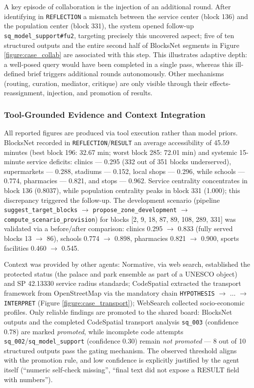 A key episode of collaboration is the injection of an additional round.
After identifying in \texttt{REFLECTION} a mismatch between the service center (block 136) and the population center (block 331), the system opened follow-up \texttt{sq\_model\_support\#fu2}, targeting precisely this uncovered aspect; five of ten structured outputs and the entire second half of BlocksNet segments in Figure \ref{figure:case_collab} are associated with this step.
This illustrates adaptive depth: a well-posed query would have been completed in a single pass, whereas this ill-defined brief triggers additional rounds autonomously.
Other mechanisms (routing, curation, mediator, critique) are only visible through their effects-reassignment, injection, and promotion of results.

\subsubsection{Tool-Grounded Evidence and Context Integration}

All reported figures are produced via tool execution rather than model priors.
BlocksNet recorded in \texttt{REFLECTION}/\texttt{RESULT} an average accessibility of 45.59 minutes (best block 196: 32.67 min; worst block 285: 72.01 min) and systemic 15-minute service deficits: clinics --- 0.295 (332 out of 351 blocks underserved), supermarkets --- 0.288, stadiums --- 0.152, local shops --- 0.296, while schools --- 0.774, pharmacies --- 0.821, and stops --- 0.962.
Service centrality concentrates in block 136 (0.8037), while population centrality peaks in block 331 (1.000); this discrepancy triggered the follow-up.
The development scenario (pipeline \texttt{suggest\_target\_blocks} $\rightarrow$ \texttt{propose\_zone\_development} $\rightarrow$ \texttt{compute\_scenario\_provision}) for blocks [2, 9, 18, 87, 89, 108, 289, 331] was validated via a before/after comparison: clinics 0.295 $\rightarrow$ 0.833 (fully served blocks 13 $\rightarrow$ 86), schools 0.774 $\rightarrow$ 0.898, pharmacies 0.821 $\rightarrow$ 0.900, sports facilities 0.460 $\rightarrow$ 0.545.

Context was provided by other agents: Normative, via web search, established the protected status (the palace and park ensemble as part of a UNESCO object) and SP 42.13330 service radius standards; CodeSpatial extracted the transport framework from OpenStreetMap via the mandatory chain \texttt{HYPOTHESIS} $\rightarrow$ $\dots$ $\rightarrow$ \texttt{INTERPRET} (Figure \ref{figure:case_transport}); WebSearch collected socio-economic profiles.
Only reliable findings are promoted to the shared board: BlocksNet outputs and the completed CodeSpatial transport analysis \texttt{sq\_003} (confidence 0.78) are marked \emph{promoted}, while incomplete code attempts \texttt{sq\_002}/\texttt{sq\_model\_support} (confidence 0.30) remain \emph{not promoted} --- 8 out of 10 structured outputs pass the gating mechanism.
The observed threshold aligns with the promotion rule, and low confidence is explicitly justified by the agent itself (“numeric self-check missing”, “final text did not expose a RESULT field with numbers”).

